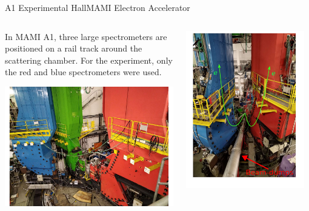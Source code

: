\documentclass[9pt,a4paper]{beamer}
\begin{document}
\begin{frame}{A1 Experimental Hall}{MAMI Electron Accelerator}

\begin{columns}[T]
\begin{column}{.5\textwidth}
In MAMI A1, three large spectrometers are positioned on a rail track around the scattering chamber. For the experiment, only the red and blue spectrometers were used.
\begin{center}
\includegraphics[width = 1\textwidth]{figures/twoSpektrometer.pdf}
\end{center}
\end{column}
\begin{column}{.5\textwidth}
\centering
\includegraphics[width = 0.95\textwidth]{figures/A1_Dietro.pdf}
\end{column}
\end{columns}


\end{frame}
\end{document}
